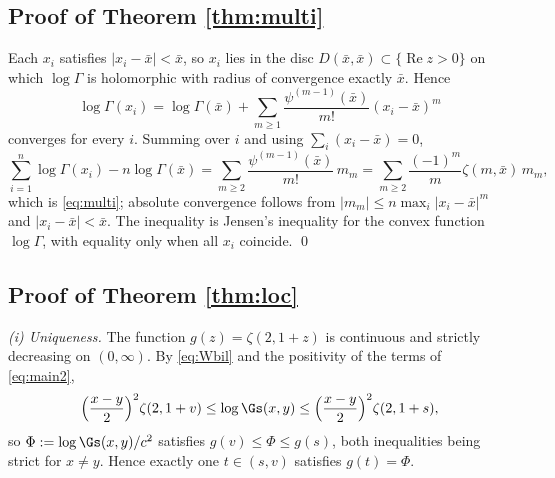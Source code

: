\subsection{Proof of Theorem \ref{thm:multi}}
Each $x_{i}$ satisfies $|x_{i}-\bar x|<\bar x$, so $x_{i}$ lies in the disc
$D(\bar x,\bar x)\subset\{\operatorname{Re}z>0\}$ on which $\log\Gamma$ is holomorphic with
radius of convergence exactly $\bar x$. Hence
\[
  \log\Gamma(x_{i})=\log\Gamma(\bar x)+\sum_{m\ge1}\frac{\psi^{(m-1)}(\bar x)}{m!}
   (x_{i}-\bar x)^{m}
\]
converges for every $i$. Summing over $i$ and using $\sum_{i}(x_{i}-\bar x)=0$,
\[
  \sum_{i=1}^{n}\log\Gamma(x_{i})-n\log\Gamma(\bar x)
  =\sum_{m\ge2}\frac{\psi^{(m-1)}(\bar x)}{m!}\,m_{m}
  =\sum_{m\ge2}\frac{(-1)^{m}}{m}\zeta(m,\bar x)\,m_{m},
\]
which is \eqref{eq:multi}; absolute convergence follows from
$|m_{m}|\le n\max_{i}|x_{i}-\bar x|^{m}$ and $|x_{i}-\bar x|<\bar x$. The inequality is
Jensen's inequality for the convex function $\log\Gamma$, with equality only when all
$x_{i}$ coincide. \qed

\subsection{Proof of Theorem \ref{thm:loc}}

\emph{(i) Uniqueness.} The function $g(z)=\zeta(2,1+z)$ is continuous and strictly decreasing
on $(0,\infty)$. By \eqref{eq:Wbil} and the positivity of the terms of \eqref{eq:main2},
\[
  \Big(\frac{x-y}{2}\Big)^{2}\zeta(2,1+v)\le\log\Gs(x,y)\le
  \Big(\frac{x-y}{2}\Big)^{2}\zeta(2,1+s),
\]
so $\Phi:=\log\Gs(x,y)/c^{2}$ satisfies $g(v)\le\Phi\le g(s)$, both inequalities being
strict for $x\ne y$. Hence exactly one $t\in(s,v)$ satisfies $g(t)=\Phi$.

